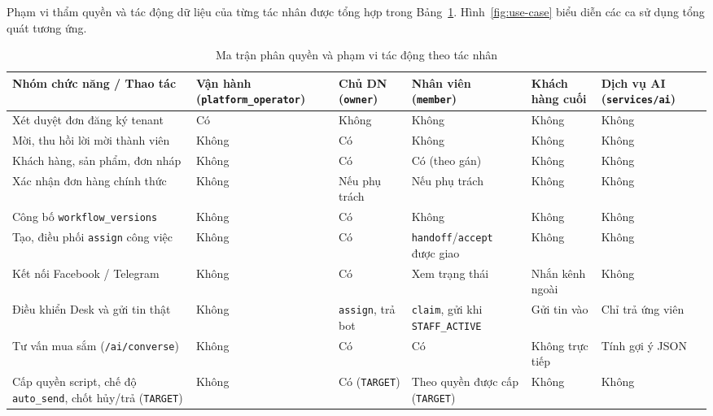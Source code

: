Phạm vi thẩm quyền và tác động dữ liệu của từng tác nhân được tổng hợp trong Bảng~\ref{tab:actor-permissions}. Hình~\ref{fig:use-case} biểu diễn các ca sử dụng tổng quát tương ứng.



\begin{table}[htbp]
  \centering
  \footnotesize
  \setlength{\tabcolsep}{3.5pt}
  \renewcommand{\arraystretch}{1.18}
  \caption{Ma trận phân quyền và phạm vi tác động theo tác nhân}\label{tab:actor-permissions}
  \begin{tabularx}{\linewidth}{@{}
    >{\raggedright\arraybackslash}X
    >{\centering\arraybackslash}p{1.8cm}
    >{\centering\arraybackslash}p{1.8cm}
    >{\centering\arraybackslash}p{2.15cm}
    >{\centering\arraybackslash}p{1.6cm}
    >{\centering\arraybackslash}p{1.9cm}@{}}
    \toprule
    Nhóm chức năng / Thao tác & Vận hành (\texttt{platform\_\hspace{0pt}operator}) & Chủ DN (\texttt{owner}) & Nhân viên (\texttt{member}) & Khách hàng cuối & Dịch vụ AI (\texttt{services/\hspace{0pt}ai}) \\
    \midrule
    Xét duyệt đơn đăng ký tenant & Có & Không & Không & Không & Không \\
    Mời, thu hồi lời mời thành viên & Không & Có & Không & Không & Không \\
    Khách hàng, sản phẩm, đơn nháp & Không & Có & Có (theo gán) & Không & Không \\
    Xác nhận đơn hàng chính thức & Không & Nếu phụ trách & Nếu phụ trách & Không & Không \\
    Công bố \texttt{workflow\_\hspace{0pt}versions} & Không & Có & Không & Không & Không \\
    Tạo, điều phối \texttt{assign} công việc & Không & Có & \texttt{handoff}/\hspace{0pt}\texttt{accept} được giao & Không & Không \\
    Kết nối Facebook / Telegram & Không & Có & Xem trạng thái & Nhắn kênh ngoài & Không \\
    Điều khiển Desk và gửi tin thật & Không & \texttt{assign}, trả bot & \texttt{claim}, gửi khi \texttt{STAFF\_\hspace{0pt}ACTIVE} & Gửi tin vào & Chỉ trả ứng viên \\
    Tư vấn mua sắm (\texttt{/ai/\hspace{0pt}converse}) & Không & Có & Có & Không trực tiếp & Tính gợi ý JSON \\
    Cấp quyền script, chế độ \texttt{auto\_\hspace{0pt}send}, chốt hủy/trả (\texttt{TARGET}) & Không & Có (\texttt{TARGET}) & Theo quyền được cấp (\texttt{TARGET}) & Không & Không \\
    \bottomrule
  \end{tabularx}
\end{table}

